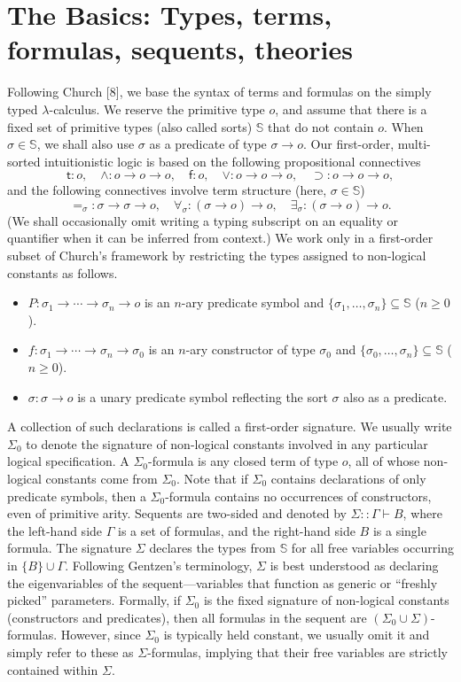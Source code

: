 \documentclass[10pt,a4paper]{article}
\newcommand{\pmS}{\mathbb S}
\newcommand{\pmt}{\mathsf t}\newcommand{\pmf}{\mathsf f}
\newcommand{\pmseq}[3]{#1\mathbin{::}#2\vdash #3}
\begin{document}
\section*{The Basics: Types, terms, formulas, sequents, theories}
Following Church [8], we base the syntax of terms and formulas on the simply typed $\lambda$-calculus. We reserve the primitive type $o$, and assume that there is a fixed set of primitive types (also called sorts) $\pmS$ that do not contain $o$. When $\sigma\in\pmS$, we shall also use $\sigma$ as a predicate of type $\sigma\to o$.
Our first-order, multi-sorted intuitionistic logic is based on the following propositional connectives
\[\pmt:o,\quad\wedge:o\to o\to o,\quad\pmf:o,\quad\vee:o\to o\to o,\quad\supset:o\to o\to o,\]
and the following connectives involve term structure (here, $\sigma\in\pmS$)
\[=_\sigma:\sigma\to\sigma\to o,\quad\forall_\sigma:(\sigma\to o)\to o,\quad\exists_\sigma:(\sigma\to o)\to o.\]
(We shall occasionally omit writing a typing subscript on an equality or quantifier when it can be inferred from context.) We work only in a first-order subset of Church's framework by restricting the types assigned to non-logical constants as follows.
\begin{itemize}
\item $P:\sigma_1\to\cdots\to\sigma_n\to o$ is an $n$-ary predicate symbol and $\{\sigma_1,\ldots,\sigma_n\}\subseteq\pmS$ ($n\geq0$).
\item $f:\sigma_1\to\cdots\to\sigma_n\to\sigma_0$ is an $n$-ary constructor of type $\sigma_0$ and $\{\sigma_0,\ldots,\sigma_n\}\subseteq\pmS$ ($n\geq0$).
\item $\sigma:\sigma\to o$ is a unary predicate symbol reflecting the sort $\sigma$ also as a predicate.
\end{itemize}
A collection of such declarations is called a first-order signature. We usually write $\Sigma_0$ to denote the signature of non-logical constants involved in any particular logical specification. A $\Sigma_0$-formula is any closed term of type $o$, all of whose non-logical constants come from $\Sigma_0$. Note that if $\Sigma_0$ contains declarations of only predicate symbols, then a $\Sigma_0$-formula contains no occurrences of constructors, even of primitive arity.
Sequents are two-sided and denoted by $\pmseq\Sigma\Gamma B$, where the left-hand side $\Gamma$ is a set of formulas, and the right-hand side $B$ is a single formula. The signature $\Sigma$ declares the types from $\pmS$ for all free variables occurring in $\{B\}\cup\Gamma$. Following Gentzen's terminology, $\Sigma$ is best understood as declaring the eigenvariables of the sequent---variables that function as generic or ``freshly picked'' parameters. Formally, if $\Sigma_0$ is the fixed signature of non-logical constants (constructors and predicates), then all formulas in the sequent are $(\Sigma_0\cup\Sigma)$-formulas. However, since $\Sigma_0$ is typically held constant, we usually omit it and simply refer to these as $\Sigma$-formulas, implying that their free variables are strictly contained within $\Sigma$.
\end{document}
